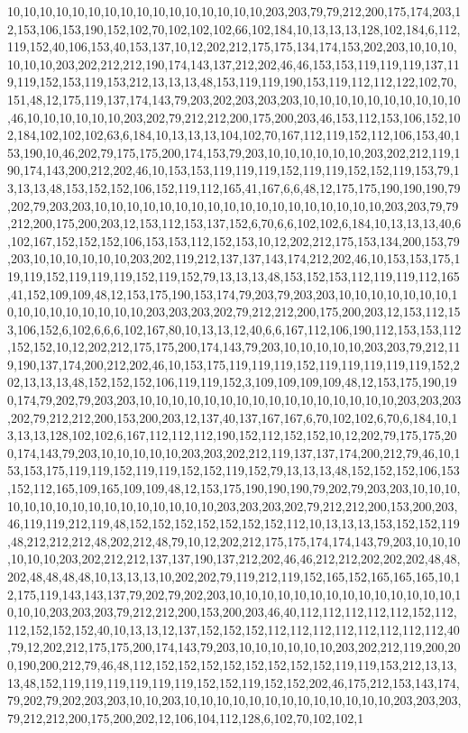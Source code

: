 10,10,10,10,10,10,10,10,10,10,10,10,10,10,10,10,203,203,79,79,212,200,175,174,203,12,153,106,153,190,152,102,70,102,102,102,66,102,184,10,13,13,13,128,102,184,6,112,119,152,40,106,153,40,153,137,10,12,202,212,175,175,134,174,153,202,203,10,10,10,10,10,10,203,202,212,212,190,174,143,137,212,202,46,46,153,153,119,119,119,137,119,119,152,153,119,153,212,13,13,13,48,153,119,119,190,153,119,112,112,122,102,70,151,48,12,175,119,137,174,143,79,203,202,203,203,203,10,10,10,10,10,10,10,10,10,10,46,10,10,10,10,10,10,203,202,79,212,212,200,175,200,203,46,153,112,153,106,152,102,184,102,102,102,63,6,184,10,13,13,13,104,102,70,167,112,119,152,112,106,153,40,153,190,10,46,202,79,175,175,200,174,153,79,203,10,10,10,10,10,10,203,202,212,119,190,174,143,200,212,202,46,10,153,153,119,119,119,152,119,119,152,152,119,153,79,13,13,13,48,153,152,152,106,152,119,112,165,41,167,6,6,48,12,175,175,190,190,190,79,202,79,203,203,10,10,10,10,10,10,10,10,10,10,10,10,10,10,10,10,10,10,203,203,79,79,212,200,175,200,203,12,153,112,153,137,152,6,70,6,6,102,102,6,184,10,13,13,13,40,6,102,167,152,152,152,106,153,153,112,152,153,10,12,202,212,175,153,134,200,153,79,203,10,10,10,10,10,10,203,202,119,212,137,137,143,174,212,202,46,10,153,153,175,119,119,152,119,119,119,152,119,152,79,13,13,13,48,153,152,153,112,119,119,112,165,41,152,109,109,48,12,153,175,190,153,174,79,203,79,203,203,10,10,10,10,10,10,10,10,10,10,10,10,10,10,10,10,203,203,203,202,79,212,212,200,175,200,203,12,153,112,153,106,152,6,102,6,6,6,102,167,80,10,13,13,12,40,6,6,167,112,106,190,112,153,153,112,152,152,10,12,202,212,175,175,200,174,143,79,203,10,10,10,10,10,203,203,79,212,119,190,137,174,200,212,202,46,10,153,175,119,119,119,152,119,119,119,119,119,152,202,13,13,13,48,152,152,152,106,119,119,152,3,109,109,109,109,48,12,153,175,190,190,174,79,202,79,203,203,10,10,10,10,10,10,10,10,10,10,10,10,10,10,10,10,203,203,203,202,79,212,212,200,153,200,203,12,137,40,137,167,167,6,70,102,102,6,70,6,184,10,13,13,13,128,102,102,6,167,112,112,112,190,152,112,152,152,10,12,202,79,175,175,200,174,143,79,203,10,10,10,10,10,203,203,202,212,119,137,137,174,200,212,79,46,10,153,153,175,119,119,152,119,119,152,152,119,152,79,13,13,13,48,152,152,152,106,153,152,112,165,109,165,109,109,48,12,153,175,190,190,190,79,202,79,203,203,10,10,10,10,10,10,10,10,10,10,10,10,10,10,10,10,203,203,203,202,79,212,212,200,153,200,203,46,119,119,212,119,48,152,152,152,152,152,152,152,112,10,13,13,13,153,152,152,119,48,212,212,212,48,202,212,48,79,10,12,202,212,175,175,174,174,143,79,203,10,10,10,10,10,10,203,202,212,212,137,137,190,137,212,202,46,46,212,212,202,202,202,48,48,202,48,48,48,48,10,13,13,13,10,202,202,79,119,212,119,152,165,152,165,165,165,10,12,175,119,143,143,137,79,202,79,202,203,10,10,10,10,10,10,10,10,10,10,10,10,10,10,10,10,10,203,203,203,79,212,212,200,153,200,203,46,40,112,112,112,112,112,152,112,112,152,152,152,40,10,13,13,12,137,152,152,152,112,112,112,112,112,112,112,112,40,79,12,202,212,175,175,200,174,143,79,203,10,10,10,10,10,10,203,202,212,119,200,200,190,200,212,79,46,48,112,152,152,152,152,152,152,152,152,119,119,153,212,13,13,13,48,152,119,119,119,119,119,119,152,152,119,152,152,202,46,175,212,153,143,174,79,202,79,202,203,203,10,10,203,10,10,10,10,10,10,10,10,10,10,10,10,10,203,203,203,79,212,212,200,175,200,202,12,106,104,112,128,6,102,70,102,102,1